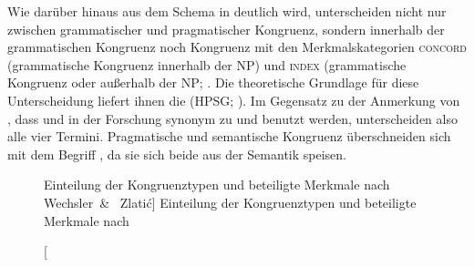 Wie darüber hinaus aus dem Schema in  deutlich wird,
unterscheiden \citet{wechslerzlatic2003} nicht nur zwischen grammatischer und
pragmatischer Kongruenz, sondern innerhalb der grammatischen Kongruenz noch
Kongruenz mit den Merkmalskategorien \textsc{concord} (grammatische Kongruenz
 innerhalb der NP) und \textsc{index} (grammatische Kongruenz
 oder  außerhalb der NP;
\cite[8--17]{wechslerzlatic2003}. Die theoretische Grundlage für diese
Unterscheidung liefert ihnen die 
(HPSG; \cite{pollardsag1994}). Im Gegensatz zu der Anmerkung von
\citet[164]{fleischer2012}, dass  und  in der Forschung
synonym zu  und  benutzt werden, unterscheiden
\citet{wechslerzlatic2003} also alle vier Termini. Pragmatische und semantische
Kongruenz überschneiden sich mit dem Begriff , da sie
sich beide aus der Semantik speisen.

\begin{figure}
\centering
{}
\caption%
	[Einteilung der Kongruenztypen und beteiligte Merkmale nach Wechsler~\&~%
	Zlatić]%
	{Einteilung der Kongruenztypen und beteiligte Merkmale nach
	\citet{wechslerzlatic2003}}
\label{fig:termini}
\end{figure}

